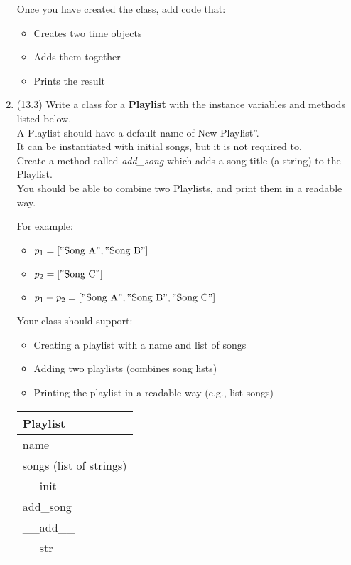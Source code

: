 \documentclass{article}
\newcommand{\csq}[1]{\reflectbox{''}#1''}  %
\newcommand{\csqt}[1]{\text{\reflectbox{''}#1''}}  %
\begin{document}
\begin{enumerate}
		Once you have created the class, add code that:
		\begin{itemize}
			\item Creates two time objects
			\item Adds them together
			\item Prints the result
		\end{itemize}



\item (13.3) %
		Write a class for a \textbf{Playlist} with the instance variables and methods listed 
		below.\\
		A Playlist should have a default name of \csq{New Playlist}.\\
		It can be instantiated with initial songs, but it is not required to.\\
		Create a method called \textit{add\_song} which adds a song title (a string) to the 
		Playlist.\\
		You should be able to combine two Playlists, and print them in a readable way.
			
		\begin{minipage}[t]{0.65\textwidth}
			For example:
			\begin{itemize}
				\item $p_1 = [\csqt{Song A}, \csqt{Song B}]$
				\item $p_2 = [\csqt{Song C}]$
				\item $p_1 + p_2 = [\csqt{Song A}, \csqt{Song B}, \csqt{Song C}]$
			\end{itemize}

			Your class should support:
			\begin{itemize}
				\item Creating a playlist with a name and list of songs
				\item Adding two playlists (combines song lists)
				\item Printing the playlist in a readable way (e.g., list songs)
			\end{itemize}	
		\end{minipage}
		\hfill
		\begin{minipage}[t]{0.32\textwidth}
			\vspace{.2em}
			\begin{flushright}
				\begin{tabular}{|l|}
					\hline
					Playlist \\ \hline
					name \\
					songs (list of strings) \\ \hline
					\_\_init\_\_ \\
					add\_song \\
					\_\_add\_\_ \\
					\_\_str\_\_ \\ \hline
				\end{tabular}
			\end{flushright}
		\end{minipage}
		

\end{enumerate}
\end{document}
